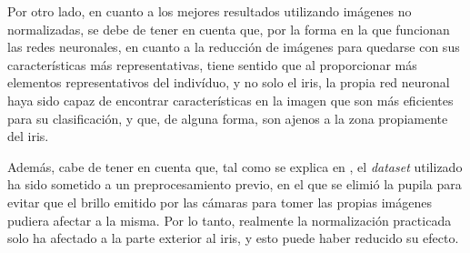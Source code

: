 Por otro lado, en cuanto a los mejores resultados utilizando imágenes no normalizadas, se debe de tener en cuenta que, por la forma en la que funcionan las redes neuronales,
en cuanto a la reducción de imágenes para quedarse con sus características más representativas, tiene sentido que al proporcionar más elementos representativos del indivíduo,
y no solo el iris, la propia red neuronal haya sido capaz de encontrar características en la imagen que son más eficientes para su clasificación, y que, de alguna forma, son
ajenos a la zona propiamente del iris.

Además, cabe de tener en cuenta que, tal como se explica en , el \textit{dataset} utilizado ha sido sometido a un preprocesamiento previo, en el que se elimió la pupila 
para evitar que el brillo emitido por las cámaras para tomer las propias imágenes pudiera afectar a la misma. Por lo tanto, realmente la normalización practicada solo ha afectado a la 
parte exterior al iris, y esto puede haber reducido su efecto.

